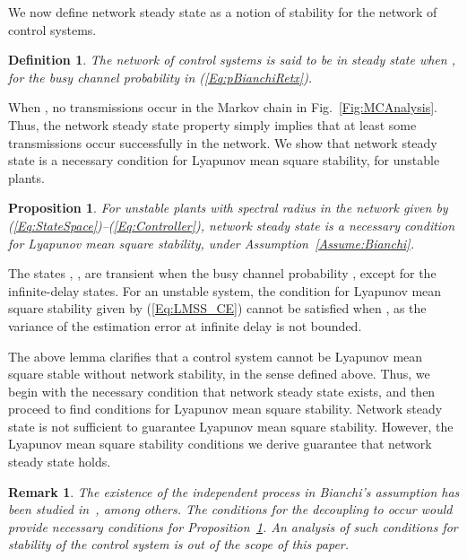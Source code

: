 \documentclass[twocolumn]{autart}
\newtheorem{proposition}[theorem]{Proposition}
\newtheorem{definition}{Definition}[section]
\newtheorem{remark}{Remark}[section]
\newenvironment{proof}[1][Proof]{\begin{trivlist}
\item[\hskip \labelsep {\bfseries #1}]}{\end{trivlist}}
\renewcommand{\qed}{}
\begin{document}
We now define network steady state as a notion of stability for the network of  control systems.
\begin{definition} \label{Def:NetworkSS}
The network of  control systems is said to be in steady state when , for the busy channel probability  in (\ref{Eq:pBianchiRetx}).
\end{definition}

When , no transmissions occur in the Markov chain in Fig.~\ref{Fig:MCAnalysis}. Thus, the network steady state property simply implies that at least some transmissions occur successfully in the network. We show that network steady state is a necessary condition for Lyapunov mean square stability, for unstable plants.
\begin{proposition} \label{Prop:SteadyStateNecForLMSS}
For unstable plants with spectral radius  in the network given by (\ref{Eq:StateSpace})--(\ref{Eq:Controller}), network steady state is a necessary condition for Lyapunov mean square stability, under Assumption~\ref{Assume:Bianchi}.
\end{proposition}
\begin{proof}
The states , , are transient when the busy channel probability , except for the infinite-delay states. For an unstable system, the condition for Lyapunov mean square stability given by (\ref{Eq:LMSS_CE}) cannot be satisfied when , as the variance of the estimation error at infinite delay is not bounded. \hfill \qed
\end{proof}

The above lemma clarifies that a control system cannot be Lyapunov mean square stable without network stability, in the sense defined above. Thus, we begin with the necessary condition that network steady state exists, and then proceed to find conditions for Lyapunov mean square stability. Network steady state is not sufficient to guarantee Lyapunov mean square stability. However, the Lyapunov mean square stability conditions we derive guarantee that network steady state holds.

\begin{remark}\textbf{}
The existence of the independent process in Bianchi's assumption has been studied in~\cite{Bordenave2010}, among others. The conditions for the decoupling to occur would provide necessary conditions for Proposition~\ref{Prop:SteadyStateNecForLMSS}. An analysis of such conditions for stability of the control system is out of the scope of this paper.
\end{remark}
\end{document}
